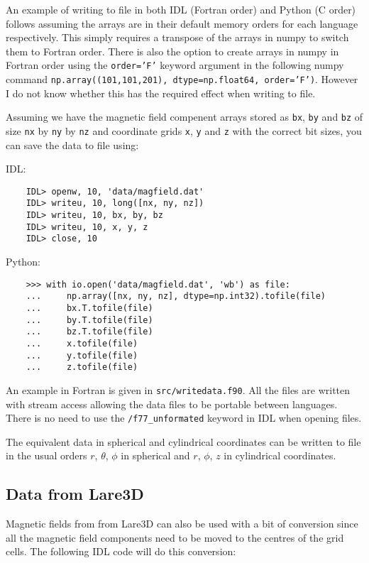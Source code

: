 \documentclass[12pt]{article}
\begin{document}
    An example of writing to file in both IDL (Fortran order) and Python (C order) follows assuming the arrays are in their default memory orders for each language respectively. This simply requires a transpose of the arrays in numpy to switch them to Fortran order. There is also the option to create arrays in numpy in Fortran order using the \texttt{order='F'} keyword argument in the following numpy command
    \texttt{np.array((101,101,201), dtype=np.float64, order='F')}. However I do not know whether this has the required effect when writing to file.
    
    Assuming we have the magnetic field compenent arrays stored as \texttt{bx}, \texttt{by} and \texttt{bz} of size \texttt{nx} by \texttt{ny} by \texttt{nz} and coordinate grids \texttt{x}, \texttt{y} and \texttt{z} with the correct bit sizes, you can save the data to file using:

    IDL:

    \begin{verbatim}
    IDL> openw, 10, 'data/magfield.dat'
    IDL> writeu, 10, long([nx, ny, nz])
    IDL> writeu, 10, bx, by, bz
    IDL> writeu, 10, x, y, z
    IDL> close, 10
    \end{verbatim}

    Python:

    \begin{verbatim}
    >>> with io.open('data/magfield.dat', 'wb') as file:
    ...     np.array([nx, ny, nz], dtype=np.int32).tofile(file)
    ...     bx.T.tofile(file)
    ...     by.T.tofile(file)
    ...     bz.T.tofile(file)
    ...     x.tofile(file)
    ...     y.tofile(file)
    ...     z.tofile(file)
    \end{verbatim}

    An example in Fortran is given in \texttt{src/writedata.f90}. All the files are written with stream access allowing the data files to be portable between languages. There is no need to use the \texttt{/f77\_unformated} keyword in IDL when opening files.

    The equivalent data in spherical and cylindrical coordinates can be written to file in the usual orders \( r \), \( \theta \), \( \phi \) in spherical and \( r \), \( \phi \), \( z \) in cylindrical coordinates.

    \subsection{Data from Lare3D}

      Magnetic fields from from Lare3D can also be used with a bit of conversion since all the magnetic field components need to be moved to the centres of the grid cells. The following IDL code will do this conversion:
\end{document}
